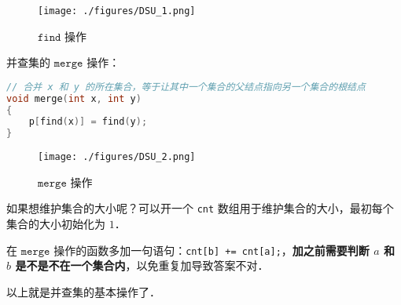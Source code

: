 \begin{figure}[ht]
\centering
\texttt{[image: ./figures/DSU\_1.png]}
\caption{$\mathtt{find}$ 操作} \label{DSU_fig1}
\end{figure}

并查集的 $\mathtt{merge}$ 操作：
\begin{lstlisting}[language=cpp]
// 合并 x 和 y 的所在集合，等于让其中一个集合的父结点指向另一个集合的根结点
void merge(int x, int y)
{
    p[find(x)] = find(y);
}
\end{lstlisting}


\begin{figure}[ht]
\centering
\texttt{[image: ./figures/DSU\_2.png]}
\caption{$\mathtt{merge}$ 操作} \label{DSU_fig2}
\end{figure}

如果想维护集合的大小呢？可以开一个 \verb|cnt| 数组用于维护集合的大小，最初每个集合的大小初始化为 $1$．

在 $\mathtt{merge}$ 操作的函数多加一句语句：\verb|cnt[b] += cnt[a];|，\textbf{加之前需要判断 $a$ 和 $b$ 是不是不在一个集合内}，以免重复加导致答案不对．


以上就是并查集的基本操作了．